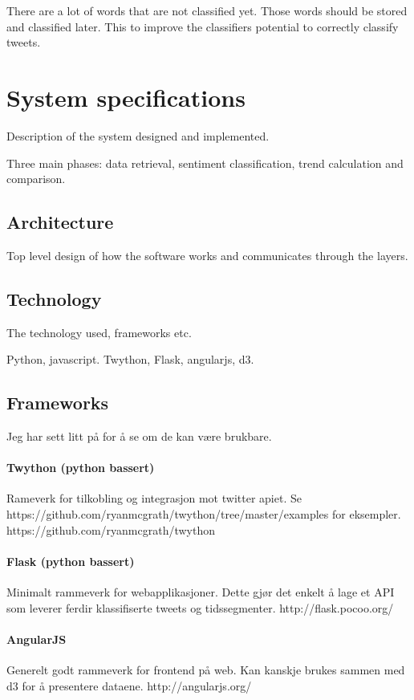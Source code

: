 There are a lot of words that are not classified yet. Those words should be
stored and classified later. This to improve the classifiers potential to
correctly classify tweets.  

\section{System specifications}
Description of the system designed and implemented. 

Three main phases: data retrieval, sentiment classification, trend calculation
and comparison. 

\subsection{Architecture}
Top level design of how the software works and communicates through the layers. 
\subsection{Technology}
The technology used, frameworks etc. 

Python, javascript. 
Twython, Flask, angularjs, d3. 

\subsection{Frameworks} 
Jeg har sett litt på for å se om de kan være brukbare. 

\paragraph{Twython (python bassert)}
Rameverk for tilkobling og integrasjon mot twitter apiet. 
Se https://github.com/ryanmcgrath/twython/tree/master/examples for eksempler. 
https://github.com/ryanmcgrath/twython

\paragraph{Flask (python bassert)}
Minimalt rammeverk for webapplikasjoner. Dette gjør det enkelt å lage et API som
leverer ferdir klassifiserte tweets og tidssegmenter. 
http://flask.pocoo.org/

\paragraph{AngularJS}
Generelt godt rammeverk for frontend på web. Kan kanskje brukes sammen med d3
for å presentere dataene. 
http://angularjs.org/

